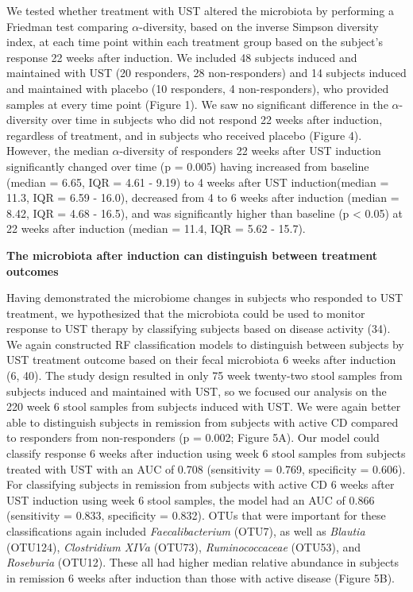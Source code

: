 \documentclass[12pt,]{article}
\begin{document}
We tested whether treatment with UST altered the microbiota by
performing a Friedman test comparing \({\alpha}\)-diversity, based on
the inverse Simpson diversity index, at each time point within each
treatment group based on the subject's response 22 weeks after
induction. We included 48 subjects induced and maintained with UST (20
responders, 28 non-responders) and 14 subjects induced and maintained
with placebo (10 responders, 4 non-responders), who provided samples at
every time point (Figure 1). We saw no significant difference in the
\({\alpha}\)-diversity over time in subjects who did not respond 22
weeks after induction, regardless of treatment, and in subjects who
received placebo (Figure 4). However, the median \({\alpha}\)-diversity
of responders 22 weeks after UST induction significantly changed over
time (p = 0.005) having increased from baseline (median = 6.65, IQR =
4.61 - 9.19) to 4 weeks after UST induction(median = 11.3, IQR = 6.59 -
16.0), decreased from 4 to 6 weeks after induction (median = 8.42, IQR =
4.68 - 16.5), and was significantly higher than baseline (p \textless{}
0.05) at 22 weeks after induction (median = 11.4, IQR = 5.62 - 15.7).

\textbf{The microbiota after induction can distinguish between treatment
outcomes}

Having demonstrated the microbiome changes in subjects who responded to
UST treatment, we hypothesized that the microbiota could be used to
monitor response to UST therapy by classifying subjects based on disease
activity (34). We again constructed RF classification models to
distinguish between subjects by UST treatment outcome based on their
fecal microbiota 6 weeks after induction (6, 40). The study design
resulted in only 75 week twenty-two stool samples from subjects induced
and maintained with UST, so we focused our analysis on the 220 week 6
stool samples from subjects induced with UST. We were again better able
to distinguish subjects in remission from subjects with active CD
compared to responders from non-responders (p = 0.002; Figure 5A). Our
model could classify response 6 weeks after induction using week 6 stool
samples from subjects treated with UST with an AUC of 0.708 (sensitivity
= 0.769, specificity = 0.606). For classifying subjects in remission
from subjects with active CD 6 weeks after UST induction using week 6
stool samples, the model had an AUC of 0.866 (sensitivity = 0.833,
specificity = 0.832). OTUs that were important for these classifications
again included \emph{Faecalibacterium} (OTU7), as well as \emph{Blautia}
(OTU124), \emph{Clostridium XIVa} (OTU73), \emph{Ruminococcaceae}
(OTU53), and \emph{Roseburia} (OTU12). These all had higher median
relative abundance in subjects in remission 6 weeks after induction than
those with active disease (Figure 5B).
\end{document}

